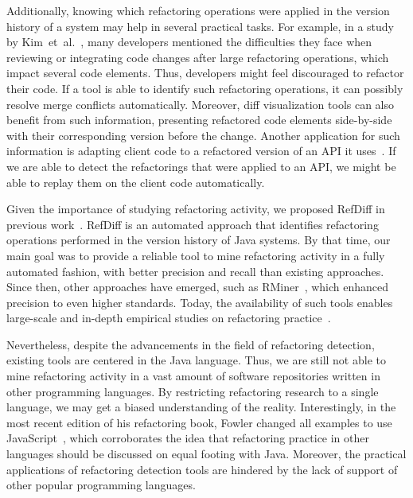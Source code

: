 \documentclass[10pt,journal,compsoc]{IEEEtran}
\begin{document}
Additionally, knowing which refactoring operations were applied in the version history of a system may help in several practical tasks.
For example, in a study by Kim~et~al.~\cite{Kim:2012:FSE}, many developers mentioned the difficulties they face when reviewing or integrating code changes after large refactoring operations, which impact several code elements. Thus, developers might feel discouraged to refactor their code. If a tool is able to identify such refactoring operations, it can possibly resolve merge conflicts automatically. 
Moreover, diff visualization tools can also benefit from such information, presenting refactored code elements side-by-side with their corresponding version before the change.
Another application for such information is adapting client code to a refactored version of an API it uses~\cite{henkel2005catchup, Xing:2008:JDevAn}. If we are able to detect the refactorings that were applied to an API, we might be able to replay them on the client code automatically.

Given the importance of studying refactoring activity, we proposed RefDiff in previous work~\cite{msr2017}. RefDiff is an automated approach that identifies refactoring operations performed in the version history of Java systems.
By that time, our main goal was to provide a reliable tool to mine refactoring activity in a fully automated fashion, with better precision and recall than existing approaches. Since then, other approaches have emerged, such as RMiner~\cite{tsantalis2018rminer}, which enhanced precision to even higher standards.
Today, the availability of such tools enables large-scale and in-depth empirical studies on refactoring practice~\cite{fse2016-why-we-refactor, icse2018}.

Nevertheless, despite the advancements in the field of refactoring detection, existing tools are centered in the Java language.
Thus, we are still not able to mine refactoring activity in a vast amount of software repositories written in other programming languages.
By restricting refactoring research to a single language, we may get a biased understanding of the reality.
Interestingly, in the most recent edition of his refactoring book, Fowler changed all examples to use JavaScript~\cite{fowler2018refactoring}, which corroborates the idea that refactoring practice in other languages should be discussed on equal footing with Java.
Moreover, the practical applications of refactoring detection tools are hindered by the lack of support of other popular programming languages.
\end{document}
